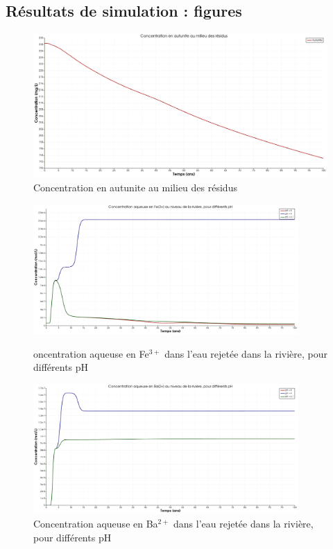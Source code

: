 \documentclass{article}
\begin{document}
\subsection{Résultats de simulation : figures}

\begin{figure}[H]
    \centering
    \includegraphics[width=0.5\linewidth]{III_B_2_2.png}
    \caption{Concentration en autunite au milieu des résidus}
    \label{fig:annexe_autunite_residus_sable_base}
\end{figure}

\begin{figure}[H]
    \centering
    \begin{minipage}{0.5\textwidth}
        \centering
        \includegraphics[width=0.9\textwidth]{III_B_2_13.png} 
        \caption{oncentration aqueuse en Fe$^{3+}$ dans l'eau rejetée dans la rivière, pour différents pH}
        \label{fig:Fe_riviere_comparaison}
    \end{minipage}\hfill
    \begin{minipage}{0.5\textwidth}
        \centering
        \includegraphics[width=0.9\textwidth]{III_B_2_14.png} 
        \caption{Concentration aqueuse en Ba$^{2+}$ dans l'eau rejetée dans la rivière, pour différents pH}
        \label{fig:Ba_rivier_comparaison}
    \end{minipage}
\end{figure}
\end{document}
